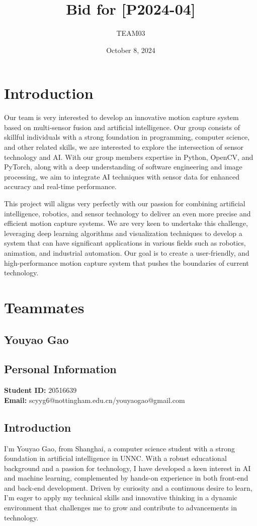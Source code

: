 \documentclass[a4paper,12pt]{article}
\title{Bid for [P2024-04]}
\author{TEAM03}
\date{October 8, 2024}
\begin{document}
\maketitle

\tableofcontents
\newpage

\section{Introduction}
Our team is very interested to develop an innovative motion capture system based on multi-sensor fusion and artificial intelligence. Our group consists of skillful individuals with a strong foundation in programming, computer science, and other related skills, we are interested to explore the intersection of sensor technology and AI. With our group members expertise in Python, OpenCV, and PyTorch, along with a deep understanding of software engineering and image processing, we aim to integrate AI techniques with sensor data for enhanced accuracy and real-time performance.

This project will aligns very perfectly with our passion for combining artificial intelligence, robotics, and sensor technology to deliver an even more precise and efficient motion capture systems. We are very keen to undertake this challenge, leveraging deep learning algorithms and visualization techniques to develop a system that can have significant applications in various fields such as robotics, animation, and industrial automation. Our goal is to create a user-friendly, and high-performance motion capture system that pushes the boundaries of current technology.
\newpage
\section{Teammates}
    \subsection{Youyao Gao}
    \subsection*{Personal Information}
    \textbf{Student ID:} 20516639 \\
    \textbf{Email:} scyyg6@nottingham.edu.cn/youyaogao@gmail.com
    
    \subsection*{Introduction}
    I'm Youyao Gao, from Shanghai, a computer science student with a strong foundation in artificial intelligence in UNNC. With a robust educational background and a passion for technology, I have developed a keen interest in AI and machine learning, complemented by hands-on experience in both front-end and back-end development. Driven by curiosity and a continuous desire to learn, I'm eager to apply my technical skills and innovative thinking in a dynamic environment that challenges me to grow and contribute to advancements in technology.
    
\end{document}
